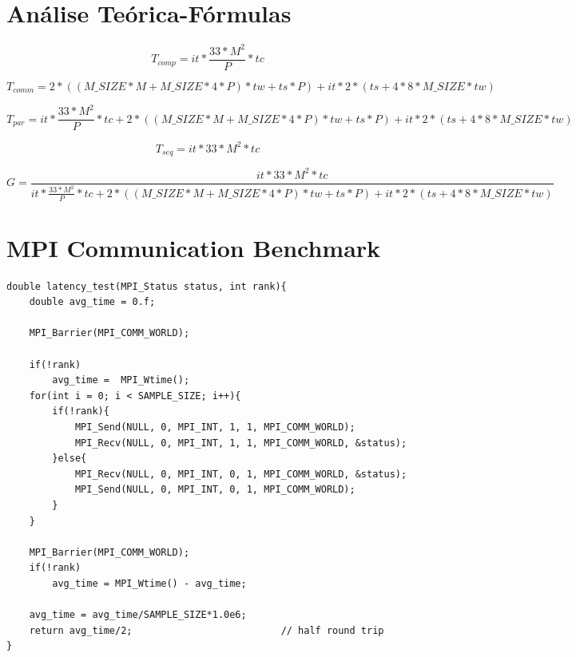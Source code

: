 \documentclass{article}
\begin{document}
\begin{appendix}
\section{Análise Teórica-Fórmulas} \label{formulas}
\begin{equation}
T_{comp} = it*\frac{33*M^2}{P}*tc \label{eq:Tcomp}
\end{equation}

\begin{equation}
T_{comm} = 2*((M\_SIZE*M+M\_SIZE*4*P)*tw+ts*P) +  it*2*(ts+4*8*M\_SIZE*tw) \label{eq:Tcomm}
\end{equation}

\begin{equation}
T_{par} = it*\frac{33*M^2}{P}*tc + 2*((M\_SIZE*M+M\_SIZE*4*P)*tw+ts*P) +  it*2*(ts+4*8*M\_SIZE*tw) \label{eq:Tpar}
\end{equation}

\begin{equation}
T_{seq} = it*33*M^2*tc \label{eq:Tseq}
\end{equation}

\begin{equation}
G=\frac{it*33*M^2*tc}{it*\frac{33*M^2}{P}*tc + 2*((M\_SIZE*M+M\_SIZE*4*P)*tw+ts*P) + it*2*(ts+4*8*M\_SIZE*tw)} \label{eq:G}
\end{equation}

\section{MPI Communication Benchmark}
\label{pingpong_mpi}
\begin{verbatim}
double latency_test(MPI_Status status, int rank){
    double avg_time = 0.f;

    MPI_Barrier(MPI_COMM_WORLD);
    
    if(!rank)
        avg_time =  MPI_Wtime();
    for(int i = 0; i < SAMPLE_SIZE; i++){
        if(!rank){
            MPI_Send(NULL, 0, MPI_INT, 1, 1, MPI_COMM_WORLD);
            MPI_Recv(NULL, 0, MPI_INT, 1, 1, MPI_COMM_WORLD, &status);
        }else{
            MPI_Recv(NULL, 0, MPI_INT, 0, 1, MPI_COMM_WORLD, &status);
            MPI_Send(NULL, 0, MPI_INT, 0, 1, MPI_COMM_WORLD);
        }    
    }
    
    MPI_Barrier(MPI_COMM_WORLD);
    if(!rank)
        avg_time = MPI_Wtime() - avg_time;

    avg_time = avg_time/SAMPLE_SIZE*1.0e6;
    return avg_time/2;                          // half round trip
}


\end{verbatim}
\end{appendix}
\end{document}
